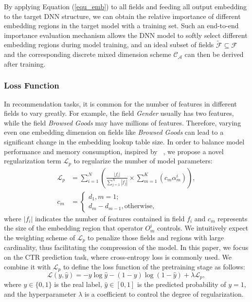 \documentclass[10pt,journal,compsoc]{IEEEtran}
\begin{document}
By applying Equation (\ref{equ_emb}) to all fields and feeding all output embedding to the target DNN structure, we can obtain the relative importance of different embedding regions in the target model with a training set. 
Such an end-to-end importance evaluation mechanism allows the DNN model to softly select different embedding regions during model training, and an ideal subset of fields $\widetilde{\mathcal{F}} \subseteq \mathcal{F}$ and the corresponding discrete mixed dimension scheme $\mathcal{C}_\mathcal{A}$ can then be derived after training.

\subsubsection{Loss Function}
In recommendation tasks, it is common for the number of features in different fields to vary greatly. For example, the field \textit{Gender} usually has two features, while the field \textit{Browsed Goods} may have millions of features. Therefore, 
{varying even one embedding dimension on fields like \textit{Browsed Goods} can lead to a significant change in the embedding lookup table size.}
In order to balance model performance and memory consumption, inspired by ~\cite{mei2019atomnas}, we propose a novel regularization term $\mathcal{L}_p$ to regularize the number of model parameters:
\begin{align}
  \mathcal{L}_{p} &= \sum_{i=1}^N \left(\frac{|f_i|}{\sum_{j=1}^N |f_j|}\times \sum_{m=1}^K \left(c_m \alpha^i_m\right)\right),\\
  c_m &=\begin{cases}\label{cum} d_1 , m=1; \\
  d_m - d_{m-1} , \text{otherwise},
\end{cases}
\end{align}
where $|f_i|$ indicates the number of features contained in field $f_i$ and $c_m$ represents the size of the embedding region that operator $O_m^i$ controls.
We intuitively expect the weighting scheme of $\mathcal{L}_p$ to penalize those fields and regions with large cardinality, thus facilitating the compression of the model.
In this paper, we focus on the CTR prediction task, where cross-entropy loss is commonly used. We combine it with $\mathcal{L}_p$ to define the loss function of the pretraining stage as follows:
\begin{equation}
  \mathcal{L}(y, \hat{y}) = -y\log{\hat{y}} -(1-y)\log(1-\hat{y}) + \lambda \mathcal{L}_p,
\end{equation}
where $y\in\{0,1\}$ is the real label, $\hat{y}\in [0,1]$ is the predicted probability of $y=1$, and the hyperparameter $\lambda$ is a coefficient to control the degree of regularization.
\end{document}
